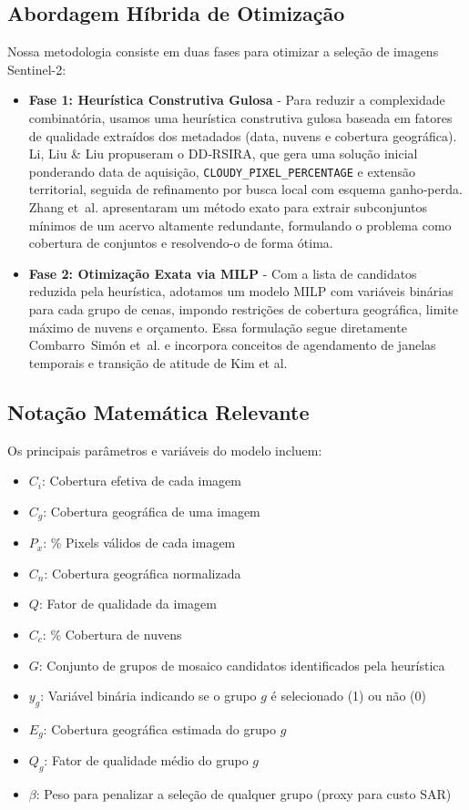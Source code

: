 \documentclass[a4paper,11pt]{article}
\begin{document}
\subsection{Abordagem Híbrida de Otimização}
Nossa metodologia consiste em duas fases para otimizar a seleção de imagens Sentinel-2:

\begin{itemize}
    \item \textbf{Fase 1: Heurística Construtiva Gulosa} - Para reduzir a complexidade combinatória, usamos uma heurística construtiva gulosa baseada em fatores de qualidade extraídos dos metadados (data, nuvens e cobertura geográfica). Li, Liu \& Liu propuseram o DD‑RSIRA, que gera uma solução inicial ponderando data de aquisição, \texttt{CLOUDY\_PIXEL\_PERCENTAGE} e extensão territorial, seguida de refinamento por busca local com esquema ganho‑perda. Zhang et al. apresentaram um método exato para extrair subconjuntos mínimos de um acervo altamente redundante, formulando o problema como cobertura de conjuntos e resolvendo-o de forma ótima.
    \item \textbf{Fase 2: Otimização Exata via MILP} - Com a lista de candidatos reduzida pela heurística, adotamos um modelo MILP com variáveis binárias para cada grupo de cenas, impondo restrições de cobertura geográfica, limite máximo de nuvens e orçamento. Essa formulação segue diretamente Combarro Simón et al. e incorpora conceitos de agendamento de janelas temporais e transição de atitude de Kim et al.
\end{itemize}

\subsection{Notação Matemática Relevante}
Os principais parâmetros e variáveis do modelo incluem:
\begin{multicols}{2}
    \begin{itemize}[leftmargin=*,noitemsep,topsep=0pt]
        \item $C_i$: Cobertura efetiva de cada imagem 
        \item $C_g$: Cobertura geográfica de uma imagem
        \item $P_x$: \% Pixels válidos de cada imagem 
        \item $C_n$: Cobertura geográfica normalizada
        \item $Q$: Fator de qualidade da imagem
        \item $C_c$: \% Cobertura de nuvens
        \item $G$: Conjunto de grupos de mosaico candidatos identificados pela heurística
        \item $y_g$: Variável binária indicando se o grupo $g$ é selecionado (1) ou não (0)
        \item $E_g$: Cobertura geográfica estimada do grupo $g$
        \item $Q_g$: Fator de qualidade médio do grupo $g$
        \item $\beta$: Peso para penalizar a seleção de qualquer grupo (proxy para custo SAR)
    \end{itemize}
\end{multicols}
\end{document}
